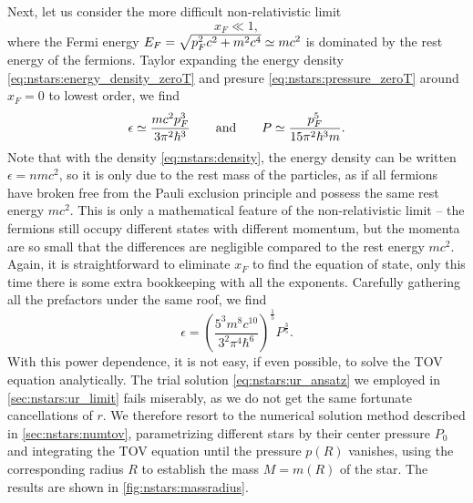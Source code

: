 Next, let us consider the more difficult non-relativistic limit
\begin{equation}
	x_F \ll 1,
\label{eq:nstars:nr_limit}
\end{equation}
where the Fermi energy $E_F = \sqrt{p_F^2 c^2 + m^2 c^4} \simeq m c^2$ is dominated by the rest energy of the fermions.
Taylor expanding the energy density \eqref{eq:nstars:energy_density_zeroT} and presure \eqref{eq:nstars:pressure_zeroT} around $x_F = 0$ to lowest order, we find
\begin{equation}
	\epsilon \simeq \frac{m c^2 p_F^3}{3 \pi^2 \hbar^3}
	\qquad \text{and} \qquad
	P        \simeq \frac{p_F^5}{15 \pi^2 \hbar^3 m} .
\end{equation}
Note that with the density \eqref{eq:nstars:density}, the energy density can be written $\epsilon = n m c^2$, so it is only due to the rest mass of the particles, as if all fermions have broken free from the Pauli exclusion principle and possess the same rest energy $m c^2$.
This is only a mathematical feature of the non-relativistic limit -- the fermions still occupy different states with different momentum, but the momenta are so small that the differences are negligible compared to the rest energy $mc^2$.
Again, it is straightforward to eliminate $x_F$ to find the equation of state, only this time there is some extra bookkeeping with all the exponents.
Carefully gathering all the prefactors under the same roof, we find
\begin{equation}
	\epsilon = \left( \frac{5^3 m^8 c^{10}}{3^2 \pi^4 \hbar^6} \right)^{\frac15}  P^{\frac35} .
\label{eq:nstars:nr_eos}
\end{equation}
With this power dependence, it is not easy, if even possible, to solve the TOV equation analytically.
The trial solution \eqref{eq:nstars:ur_ansatz} we employed in \cref{sec:nstars:ur_limit} fails miserably, as we do not get the same fortunate cancellations of $r$.
We therefore resort to the numerical solution method described in \cref{sec:nstars:numtov}, parametrizing different stars by their center pressure $P_0$ and integrating the TOV equation until the pressure $p(R)$ vanishes, using the corresponding radius $R$ to establish the mass $M = m(R)$ of the star.
The results are shown in \cref{fig:nstars:massradius}.

